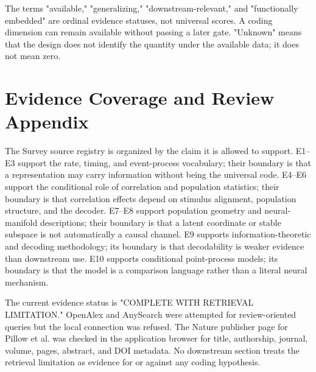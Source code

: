 \documentclass[conference]{IEEEtran}
\begin{document}
The terms "available," "generalizing," "downstream-relevant," and "functionally embedded" are ordinal evidence statuses, not universal scores. A coding dimension can remain available without passing a later gate. "Unknown" means that the design does not identify the quantity under the available data; it does not mean zero.

\section{Evidence Coverage and Review Appendix}
The Survey source registry is organized by the claim it is allowed to support. E1--E3 support the rate, timing, and event-process vocabulary; their boundary is that a representation may carry information without being the universal code. E4--E6 support the conditional role of correlation and population statistics; their boundary is that correlation effects depend on stimulus alignment, population structure, and the decoder. E7--E8 support population geometry and neural-manifold descriptions; their boundary is that a latent coordinate or stable subspace is not automatically a causal channel. E9 supports information-theoretic and decoding methodology; its boundary is that decodability is weaker evidence than downstream use. E10 supports conditional point-process models; its boundary is that the model is a comparison language rather than a literal neural mechanism.

The current evidence status is "COMPLETE WITH RETRIEVAL LIMITATION." OpenAlex and AnySearch were attempted for review-oriented queries but the local connection was refused. The Nature publisher page for Pillow et al. was checked in the application browser for title, authorship, journal, volume, pages, abstract, and DOI metadata. No downstream section treats the retrieval limitation as evidence for or against any coding hypothesis.
\end{document}
